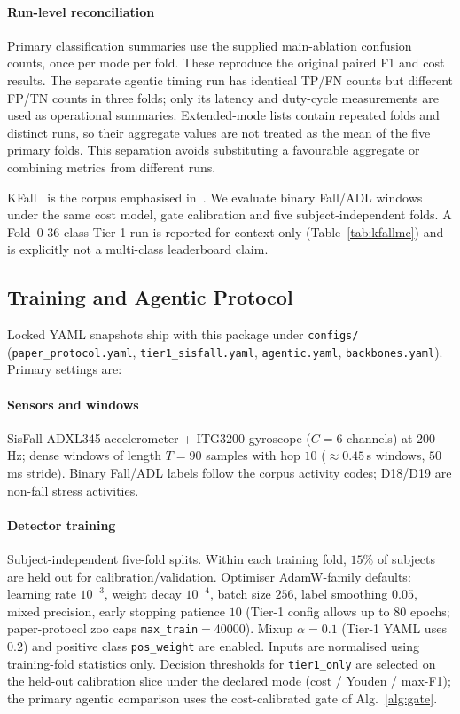\documentclass[journal]{IEEEtran}
\begin{document}
\paragraph{Run-level reconciliation}
Primary classification summaries use the supplied main-ablation confusion counts, once per mode per fold. These reproduce the original paired F1 and cost results. The separate agentic timing run has identical TP/FN counts but different FP/TN counts in three folds; only its latency and duty-cycle measurements are used as operational summaries. Extended-mode lists contain repeated folds and distinct runs, so their aggregate values are not treated as the mean of the five primary folds. This separation avoids substituting a favourable aggregate or combining metrics from different runs.

KFall~\cite{kfall2021} is the corpus emphasised in~\cite{bhatti2025beyond}. We evaluate binary Fall/ADL windows under the same cost model, gate calibration and five subject-independent folds. A Fold~0 $36$-class Tier-1 run is reported for context only (Table~\ref{tab:kfallmc}) and is explicitly not a multi-class leaderboard claim.

\subsection{Training and Agentic Protocol}
\label{sec:trainproto}
Locked YAML snapshots ship with this package under \texttt{configs/}
(\texttt{paper\_protocol.yaml}, \texttt{tier1\_sisfall.yaml},
\texttt{agentic.yaml}, \texttt{backbones.yaml}). Primary settings are:

\paragraph{Sensors and windows}
SisFall ADXL345 accelerometer + ITG3200 gyroscope ($C{=}6$ channels) at
$200$\,Hz; dense windows of length $T{=}90$ samples with hop $10$
($\approx 0.45$\,s windows, $50$\,ms stride). Binary Fall/ADL labels follow
the corpus activity codes; D18/D19 are non-fall stress activities.

\paragraph{Detector training}
Subject-independent five-fold splits. Within each training fold, $15\%$ of
subjects are held out for calibration/validation. Optimiser AdamW-family
defaults: learning rate $10^{-3}$, weight decay $10^{-4}$, batch size $256$,
label smoothing $0.05$, mixed precision, early stopping patience $10$
(Tier-1 config allows up to $80$ epochs; paper-protocol zoo caps
\texttt{max\_train}${}={}$40000). Mixup $\alpha{=}0.1$ (Tier-1 YAML uses
$0.2$) and positive class \texttt{pos\_weight} are enabled. Inputs are
normalised using training-fold statistics only. Decision thresholds for
\texttt{tier1\_only} are selected on the held-out calibration slice under the
declared mode (cost / Youden / max-F1); the primary agentic comparison uses
the cost-calibrated gate of Alg.~\ref{alg:gate}.
\end{document}
